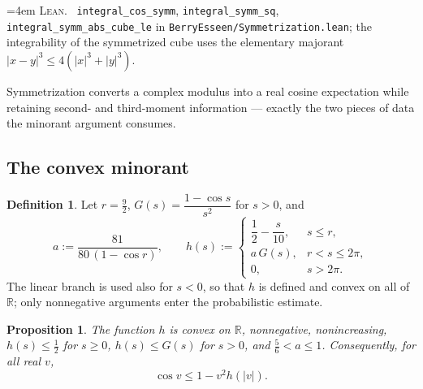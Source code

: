 \documentclass[10pt,a4paper]{article}
\theoremstyle{plain}
\newtheorem{proposition}[theorem]{Proposition}
\theoremstyle{definition}
\newtheorem{definition}[theorem]{Definition}
\newcommand{\R}{\mathbb{R}}
\newcommand{\lean}[1]{\texttt{#1}}
\newcommand{\file}[1]{\texttt{#1}}
\newenvironment{leanref}%
  {\par\addvspace{3pt}\begingroup\sloppy\emergencystretch=4em
   \noindent\footnotesize\textsc{Lean.}\ \ignorespaces}%
  {\par\endgroup\addvspace{3pt}}
\begin{document}
\begin{leanref}
\lean{integral\_cos\_symm}, \lean{integral\_symm\_sq},
\lean{integral\_symm\_abs\_cube\_le} in
\file{BerryEsseen/Symmetrization.lean}; the integrability of the symmetrized
cube uses the elementary majorant
$|x-y|^3\le4(|x|^3+|y|^3)$.
\end{leanref}

Symmetrization converts a complex modulus into a real cosine expectation while
retaining second- and third-moment information --- exactly the two pieces of
data the minorant argument consumes.

\subsection{The convex minorant}

\begin{definition}\label{def:minorant}
Let $r=\tfrac92$, $G(s)=\dfrac{1-\cos s}{s^2}$ for $s>0$, and
\[
  a := \frac{81}{80\,(1-\cos r)},
  \qquad
  h(s) := \begin{cases}
    \dfrac12-\dfrac{s}{10}, & s\le r,\\[2mm]
    a\,G(s), & r< s\le 2\pi,\\[1mm]
    0, & s>2\pi .
  \end{cases}
\]
The linear branch is used also for $s<0$, so that $h$ is defined and convex on
all of $\R$; only nonnegative arguments enter the probabilistic estimate.
\end{definition}

\begin{proposition}\label{prop:minorant}
The function $h$ is convex on $\R$, nonnegative, nonincreasing,
$h(s)\le\tfrac12$ for $s\ge0$, $h(s)\le G(s)$ for $s>0$, and
$\tfrac56<a\le1$. Consequently, for all real $v$,
\begin{equation}\label{eq:cos-minorant}
  \cos v \le 1 - v^2 h(|v|).
\end{equation}
\end{proposition}
\end{document}
